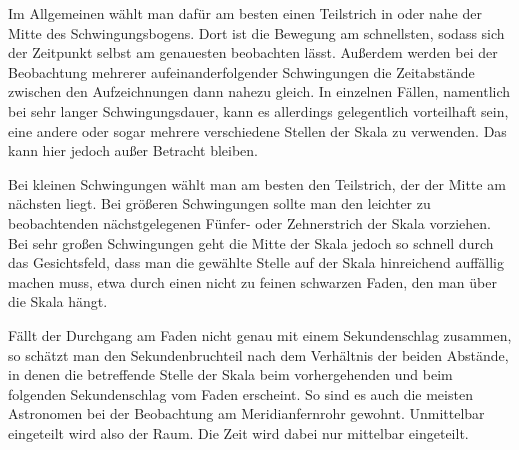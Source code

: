 Im Allgemeinen wählt man dafür am besten einen Teilstrich in oder nahe der Mitte des Schwingungsbogens. Dort ist die Bewegung am schnellsten, sodass sich der Zeitpunkt selbst am genauesten beobachten lässt. Außerdem werden bei der Beobachtung mehrerer aufeinanderfolgender Schwingungen die Zeitabstände zwischen den Aufzeichnungen dann nahezu gleich. In einzelnen Fällen, namentlich bei sehr langer Schwingungsdauer, kann es allerdings gelegentlich vorteilhaft sein, eine andere oder sogar mehrere verschiedene Stellen der Skala zu verwenden. Das kann hier jedoch außer Betracht bleiben.

Bei kleinen Schwingungen wählt man am besten den Teilstrich, der der Mitte am nächsten liegt. Bei größeren Schwingungen sollte man den leichter zu beobachtenden nächstgelegenen Fünfer- oder Zehnerstrich der Skala vorziehen. Bei sehr großen Schwingungen geht die Mitte der Skala jedoch so schnell durch das Gesichtsfeld, dass man die gewählte Stelle auf der Skala hinreichend auffällig machen muss, etwa durch einen nicht zu feinen schwarzen Faden, den man über die Skala hängt.

Fällt der Durchgang am Faden nicht genau mit einem Sekundenschlag zusammen, so schätzt man den Sekundenbruchteil nach dem Verhältnis der beiden Abstände, in denen die betreffende Stelle der Skala beim vorhergehenden und beim folgenden Sekundenschlag vom Faden erscheint. So sind es auch die meisten Astronomen bei der Beobachtung am Meridianfernrohr gewohnt. Unmittelbar eingeteilt wird also der Raum. Die Zeit wird dabei nur mittelbar eingeteilt.

